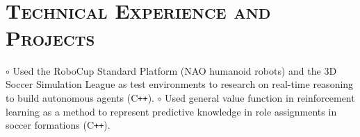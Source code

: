 \begin{resume}

\begin{formatb}
  \\
  \body\\
\end{formatb}





\begin{formatb}
  \\
  \body\\
\end{formatb}

\vspace{-2mm}
\section{\textsc{Technical Experience and Projects}}


\begin{position}
$\circ$ Used the RoboCup Standard Platform (NAO humanoid robots) and the 3D Soccer Simulation 
League as 
test environments to research on real-time reasoning to build autonomous agents (C\texttt{++}). 
\newline $\circ$  
Used 
general value function in reinforcement learning as a method to  represent predictive knowledge in 
role assignments in soccer formations (C\texttt{++}).
\end{position}


\end{resume}
